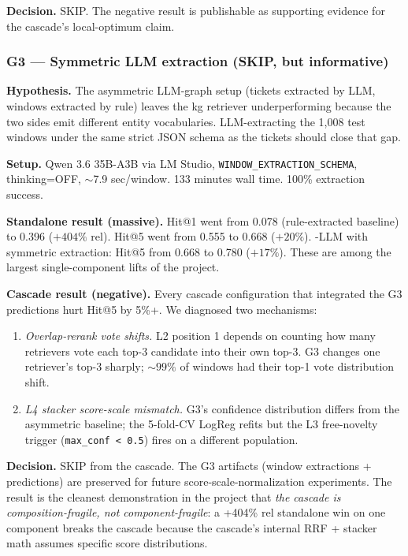 \textbf{Decision.} SKIP. The negative result is publishable as supporting evidence for the cascade's local-optimum claim.

\subsubsection{G3 --- Symmetric LLM extraction (SKIP, but informative)}

\textbf{Hypothesis.} The asymmetric LLM-graph setup (tickets extracted by LLM, windows extracted by rule) leaves the kg retriever underperforming because the two sides emit different entity vocabularies. LLM-extracting the 1{,}008 test windows under the same strict JSON schema as the tickets should close that gap.

\textbf{Setup.} Qwen 3.6 35B-A3B via LM Studio, \texttt{WINDOW\_EXTRACTION\_SCHEMA}, thinking=OFF, $\sim$7.9 sec/window. 133 minutes wall time. 100\% extraction success.

\textbf{Standalone result (massive).} \kgret{} Hit@1 went from 0.078 (rule-extracted baseline) to 0.396 ($+404\%$ rel). Hit@5 went from 0.555 to 0.668 ($+20\%$). \hrrf{}-LLM with symmetric extraction: Hit@5 from 0.668 to 0.780 ($+17\%$). These are among the largest single-component lifts of the project.

\textbf{Cascade result (negative).} Every cascade configuration that integrated the G3 predictions hurt Hit@5 by 5\%+. We diagnosed two mechanisms:

\begin{enumerate}
\item \emph{Overlap-rerank vote shifts.} L2 position 1 depends on counting how many retrievers vote each \bienc{} top-3 candidate into their own top-3. G3 changes one retriever's top-3 sharply; ${\sim}99\%$ of windows had their top-1 vote distribution shift.
\item \emph{L4 stacker score-scale mismatch.} G3's confidence distribution differs from the asymmetric baseline; the 5-fold-CV LogReg refits but the L3 free-novelty trigger (\texttt{max\_conf < 0.5}) fires on a different population.
\end{enumerate}

\textbf{Decision.} SKIP from the cascade. The G3 artifacts (window extractions + predictions) are preserved for future score-scale-normalization experiments. The result is the cleanest demonstration in the project that \emph{the cascade is composition-fragile, not component-fragile}: a +404\% rel standalone win on one component breaks the cascade because the cascade's internal RRF + stacker math assumes specific score distributions.

